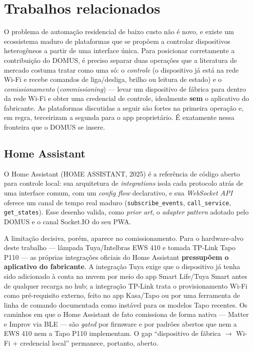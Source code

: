 \section{Trabalhos relacionados}\label{cap:relacionados}

O problema de automação residencial de baixo custo não é novo, e existe um
ecossistema maduro de plataformas que se propõem a controlar dispositivos
heterogêneos a partir de uma interface única. Para posicionar corretamente a
contribuição do DOMUS, é preciso separar duas operações que a literatura de
mercado costuma tratar como uma só: o \textit{controle} (o dispositivo já está na
rede Wi-Fi e recebe comandos de liga/desliga, brilho ou leitura de estado) e o
\textit{comissionamento} (\textit{commissioning}) --- levar um dispositivo de
fábrica para dentro da rede Wi-Fi e obter uma credencial de controle, idealmente
\textbf{sem} o aplicativo do fabricante. As plataformas discutidas a seguir são
fortes na primeira operação e, em regra, terceirizam a segunda para o app
proprietário. É exatamente nessa fronteira que o DOMUS se insere.

\subsection{Home Assistant}\label{sec:home-assistant}

O Home Assistant (HOME ASSISTANT, 2025) é a referência de código aberto para
controle local: sua arquitetura de \textit{integrations} isola cada protocolo
atrás de uma interface comum, com um \textit{config flow} declarativo, e sua
\textit{WebSocket API} oferece um canal de tempo real maduro (\texttt{subscribe\_events},
\texttt{call\_service}, \texttt{get\_states}). Esse desenho valida, como \textit{prior
art}, o \textit{adapter pattern} adotado pelo DOMUS e o canal Socket.IO do seu PWA.

A limitação decisiva, porém, aparece no comissionamento. Para o hardware-alvo
deste trabalho --- lâmpada Tuya/Intelbras EWS 410 e tomada TP-Link Tapo P110 ---
as próprias integrações oficiais do Home Assistant \textbf{pressupõem o aplicativo
do fabricante}. A integração Tuya exige que o dispositivo já tenha sido adicionado
à conta na nuvem por meio do app Smart Life/Tuya Smart antes de qualquer
recarga no hub; a integração TP-Link trata o provisionamento Wi-Fi como
pré-requisito externo, feito no app Kasa/Tapo ou por uma ferramenta de linha de
comando documentada como instável para os modelos Tapo recentes. Os caminhos em
que o Home Assistant de fato comissiona de forma nativa --- Matter e Improv via
BLE --- são \textit{gated} por firmware e por padrões abertos que nem a EWS 410 nem
a Tapo P110 implementam. O gap ``dispositivo de fábrica $\rightarrow$ Wi-Fi $+$
credencial local'' permanece, portanto, aberto.

